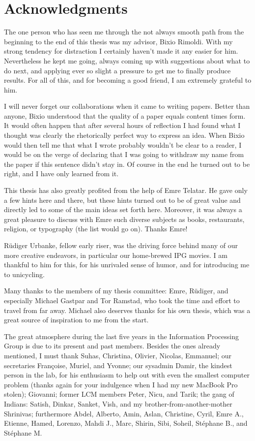 \chapter*{Acknowledgments}

The one person who has seen me through the not always smooth path from the
beginning to the end of this thesis was my advisor, Bixio Rimoldi. With my
strong tendency for distraction I certainly haven't made it any easier for him.
Nevertheless he kept me going, always coming up with suggestions about what to
do next, and applying ever so slight a pressure to get me to finally produce
results. For all of this, and for becoming a good friend, I am extremely
grateful to him. 

I will never forget our collaborations when it came to writing papers. Better
than anyone, Bixio understood that the quality of a paper equals content times
form. It would often happen that after several hours of reflection I had found
what I thought was clearly the rhetorically perfect way to express an idea.
When Bixio would then tell me that what I wrote probably wouldn't be clear to a
reader, I would be  on the verge of declaring that I was going to withdraw my
name from the paper if this sentence didn't stay in. Of course in the end he
turned out to be right, and I have only learned from it.

This thesis has also greatly profited from the help of Emre Telatar. He gave
only a few hints here and there, but these hints turned out to be of great value
and directly led to some of the main ideas set forth here. Moreover, it was
always a great pleasure to discuss with Emre such diverse subjects as books,
restaurants, religion, or typography (the list would go on). Thanks Emre!

Rüdiger Urbanke, fellow early riser, was the driving force behind many of our
more creative endeavors, in particular our home-brewed IPG movies. I am thankful
to him for this, for his unrivaled sense of humor, and for introducing me to
unicycling. 

Many thanks to the members of my thesis committee: Emre, Rüdiger, and especially
Michael Gastpar and Tor Ramstad, who took the time and effort to travel from far
away. Michael also deserves thanks for his own thesis, which was a great source
of inspiration to me from the start.

The great atmosphere during the last five years in the Information Processing
Group is due to its present and past members. Besides the ones already
mentioned, I must thank Suhas, Christina, Olivier, Nicolas, Emmanuel; our
secretaries Françoise, Muriel, and Yvonne; our sysadmin Damir, the kindest
person in the lab, for his enthusiasm to help out with even the smallest
computer problem (thanks again for your indulgence when I had my new MacBook Pro
stolen); Giovanni; former LCM members Peter, Nicu, and Tarik; the gang of
Indians: Satish, Dinkar, Sanket, Vish, and my brother-from-another-mother
Shrinivas; furthermore Abdel, Alberto, Amin, Aslan, Christine, Cyril, Emre A.,
Etienne, Hamed, Lorenzo, Mahdi J., Marc, Shirin, Sibi, Soheil, Stéphane B., and
Stéphane M.

